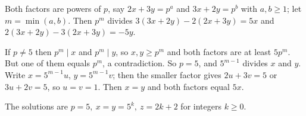 Both factors are powers of $p$, say $2x+3y=p^a$ and $3x+2y=p^b$ with $a,b\ge1$; let $m=\min(a,b)$. Then $p^m$ divides $3(3x+2y)-2(2x+3y)=5x$ and $2(3x+2y)-3(2x+3y)=-5y$.

If $p\ne5$ then $p^m\mid x$ and $p^m\mid y$, so $x,y\ge p^m$ and both factors are at least $5p^m$. But one of them equals $p^m$, a contradiction. So $p=5$, and $5^{m-1}$ divides $x$ and $y$. Write $x=5^{m-1}u$, $y=5^{m-1}v$; then the smaller factor gives $2u+3v=5$ or $3u+2v=5$, so $u=v=1$. Then $x=y$ and both factors equal $5x$.

The solutions are $\boxed{p=5,\ x=y=5^k,\ z=2k+2}$ for integers $k\ge0$.
